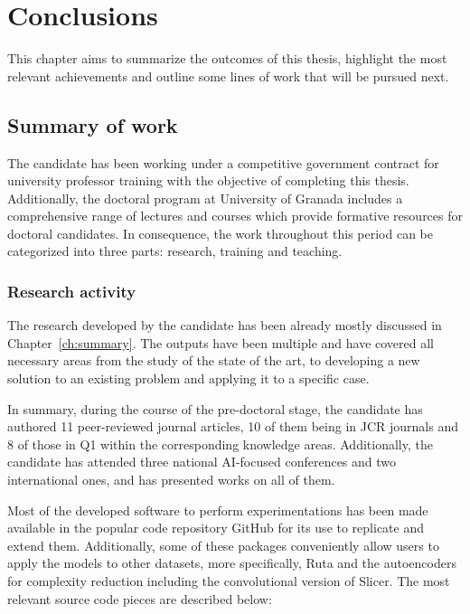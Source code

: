 \setchapterpreamble[u]{\margintoc}
\chapter{Conclusions}
\label{ch:conclusions}

This chapter aims to summarize the outcomes of this thesis, highlight the most relevant achievements and outline some lines of work that will be pursued next.

\section{Summary of work}

The candidate has been working under a competitive government contract for university professor training with the objective of completing this thesis. Additionally, the doctoral program at University of Granada includes a comprehensive range of lectures and courses which provide formative resources for doctoral candidates. In consequence, the work throughout this period can be categorized into three parts: research, training and teaching.

\subsection{Research activity}

The research developed by the candidate has been already mostly discussed in Chapter~\ref{ch:summary}. The outputs have been multiple and have covered all necessary areas from the study of the state of the art, to developing a new solution to an existing problem and applying it to a specific case.

In summary, during the course of the pre-doctoral stage, the candidate has authored 11 peer-reviewed journal articles, 10 of them being in JCR journals and 8 of those in Q1 within the corresponding knowledge areas. Additionally, the candidate has attended three national AI-focused conferences and two international ones, and has presented works on all of them.

Most of the developed software to perform experimentations has been made available in the popular code repository GitHub for its use to replicate and extend them. Additionally, some of these packages conveniently allow users to apply the models to other datasets, more specifically, Ruta and the autoencoders for complexity reduction including the convolutional version of Slicer. The most relevant source code pieces are described below:

